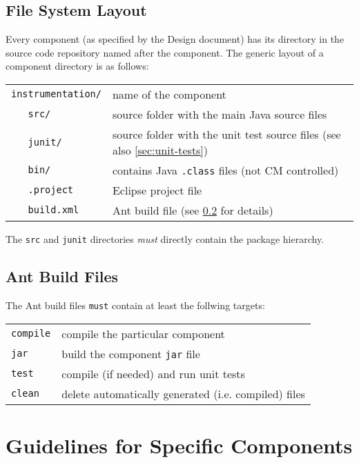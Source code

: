 \documentclass[a4paper,12pt,liststotoc,DIV12]{scrartcl}
\begin{document}
\subsection{File System Layout}
\label{sec:fs-layout}

Every component (as specified by the Design document) has its
directory in the source code repository named after the component. The
generic layout of a component directory is as follows:

\begin{tabular}{ll}
  \verb!instrumentation/! & name of the component\\
  \verb!   src/! & source folder with the main Java source files\\
  \verb!   junit/! & source folder with the unit test source files (see also \ref{sec:unit-tests})\\
  \verb!   bin/! & contains Java \texttt{.class} files (not CM controlled)\\
  \verb!   .project! & Eclipse project file\\
  \verb!   build.xml! & Ant build file (see \ref{sec:ant-build-files} for details)\\  
\end{tabular}

The \texttt{src} and \texttt{junit} directories \emph{must} directly contain
the package hierarchy.

\subsection{Ant Build Files}
\label{sec:ant-build-files}

The Ant build files \texttt{must} contain at least the follwing targets:

\begin{tabular}{ll}
  \texttt{compile} & compile the particular component\\
  \texttt{jar} & build the component \texttt{jar} file\\
  \texttt{test} & compile (if needed) and run unit tests\\
  \texttt{clean} & delete automatically generated (i.e. compiled) files\\
\end{tabular}


\section{Guidelines for Specific Components}
\label{sec:specific-components}
\end{document}
